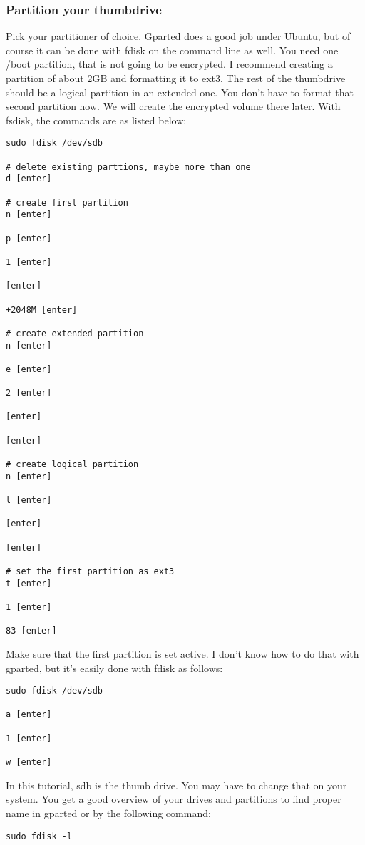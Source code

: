 \documentclass[12pt,a4paper]{article}
\begin{document}
\subsubsection{Partition your thumbdrive}
Pick your partitioner of choice. Gparted does a good job under Ubuntu, but of course it can be done with fdisk on the command line as well. You need one /boot partition, that is not going to be encrypted. I recommend creating a partition of about 2GB and formatting it to ext3. The rest of the thumbdrive should be a logical partition in an extended one. You don't have to format that second partition now. We will create the encrypted volume there later. With fsdisk, the commands are as listed below:
\begin{Verbatim}[commandchars=\\\{\}]
sudo fdisk /dev/sdb

# delete existing parttions, maybe more than one
d [enter]

# create first partition
n [enter]

p [enter]

1 [enter]

[enter]

+2048M [enter]

# create extended partition
n [enter]

e [enter]

2 [enter]

[enter]

[enter]

# create logical partition
n [enter]

l [enter]

[enter]

[enter]

# set the first partition as ext3
t [enter]

1 [enter]

83 [enter] 
\end{Verbatim}

Make sure that the first partition is set active. I don't know how to do that with gparted, but it's easily done with fdisk as follows:
\begin{Verbatim}[commandchars=\\\{\}]
sudo fdisk /dev/sdb

a [enter]

1 [enter]

w [enter]

\end{Verbatim}
In this tutorial, sdb is the thumb drive. You may have to change that on your system. You get a good overview of your drives and partitions to find proper name in gparted or by the following command:
\begin{Verbatim}[commandchars=\\\{\}]
sudo fdisk -l
\end{Verbatim}
\end{document}
